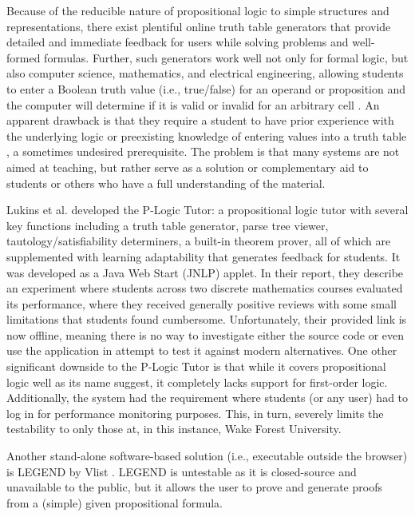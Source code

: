 \documentclass[ms]{uncgdissertationexp2}
\theoremstyle{plain}
\theoremstyle{definition}
\theoremstyle{remark}
\begin{document}
Because of the reducible nature of propositional logic to simple structures and representations, there exist plentiful online truth table generators that provide detailed and immediate feedback for users while solving problems and well-formed formulas. Further, such generators work well not only for formal logic, but also computer science, mathematics, and electrical engineering, allowing students to enter a Boolean truth value (i.e., true/false) for an operand or proposition and the computer will determine if it is valid or invalid for an arbitrary cell \cite{truthtablefennell}. An apparent drawback is that they require a student to have prior experience with the underlying logic or preexisting knowledge of entering values into a truth table \cite{koedinger}, a sometimes undesired prerequisite. The problem is that many systems are not aimed at teaching, but rather serve as a solution or complementary aid to students or others who have a full understanding of the material.

Lukins et al. \cite{lukins} developed the P-Logic Tutor: a propositional logic tutor with several key functions including a truth table generator, parse tree viewer, tautology/satisfiability determiners, a built-in theorem prover, all of which are supplemented with learning adaptability that generates feedback for students. It was developed as a Java Web Start (JNLP) applet. In their report, they describe an experiment where students across two discrete mathematics courses evaluated its performance, where they received generally positive reviews with some small limitations that students found cumbersome. Unfortunately, their provided link is now offline, meaning there is no way to investigate either the source code or even use the application in attempt to test it against modern alternatives. One other significant downside to the P-Logic Tutor is that while it covers propositional logic well as its name suggest, it completely lacks support for first-order logic. Additionally, the system had the requirement where students (or any user) had to log in for performance monitoring purposes. This, in turn, severely limits the testability to only those at, in this instance, Wake Forest University. 

Another stand-alone software-based solution (i.e., executable outside the browser) is LEGEND by Vlist \cite{vlist}. LEGEND is untestable as it is closed-source and unavailable to the public, but it allows the user to prove and generate proofs from a (simple) given propositional formula.
\end{document}
